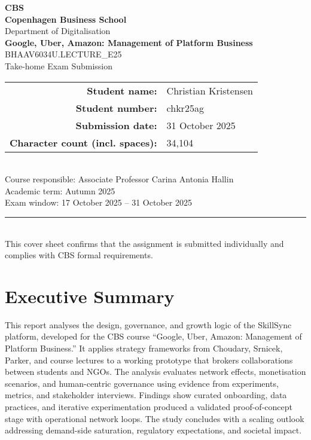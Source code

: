 \documentclass[12pt,a4paper]{article}
\newcommand{\university}{Copenhagen Business School}
\newcommand{\faculty}{Department of Digitalisation}
\newcommand{\examTitle}{Google, Uber, Amazon: Management of Platform Business}
\newcommand{\examCode}{BHAAV6034U.LECTURE\_E25}
\newcommand{\examType}{Take-home Exam Submission}
\newcommand{\studentName}{Christian Kristensen}
\newcommand{\studentId}{chkr25ag}
\newcommand{\submissionDate}{31 October 2025}
\newcommand{\wordCount}{34,104}
\begin{document}
\begin{titlepage}
  \thispagestyle{empty}
  \centering
  {\Large \textcolor{gray!70}{\textbf{CBS}}}\\[1cm]
  {\Large \textbf{\university}}\\[0.5cm]
  {\large \faculty}\\[1.5cm]
  {\LARGE \textbf{\examTitle}}\\[0.5cm]
  {\large \examCode\\\examType}\\[1.5cm]
  \begin{tabular}{rl}
    \textbf{Student name:} & \studentName \\
    \textbf{Student number:} & \studentId \\
    \textbf{Submission date:} & \submissionDate \\
    \textbf{Character count (incl. spaces):} & \wordCount \\
  \end{tabular}\\[1.5cm]
  \vfill
  {\large Course responsible: Associate Professor Carina Antonia Hallin}\\[0.3cm]
  {\large Academic term: Autumn 2025}\\[0.3cm]
  {\large Exam window: 17 October 2025 -- 31 October 2025}\\[1.5cm]
  \rule{0.8\linewidth}{0.4pt}\\[0.5cm]
  {\small This cover sheet confirms that the assignment is submitted individually and complies with CBS formal requirements.}
\end{titlepage}

\setcounter{secnumdepth}{-1}
\makeatletter
\renewcommand{\numberline}[1]{}
\makeatother

\section*{Executive Summary}
This report analyses the design, governance, and growth logic of the SkillSync platform, developed for the CBS course ``Google, Uber, Amazon: Management of Platform Business.'' It applies strategy frameworks from Choudary, Srnicek, Parker, and course lectures to a working prototype that brokers collaborations between students and NGOs. The analysis evaluates network effects, monetisation scenarios, and human-centric governance using evidence from experiments, metrics, and stakeholder interviews. Findings show curated onboarding, data practices, and iterative experimentation produced a validated proof-of-concept stage with operational network loops. The study concludes with a scaling outlook addressing demand-side saturation, regulatory expectations, and societal impact.
\end{document}
